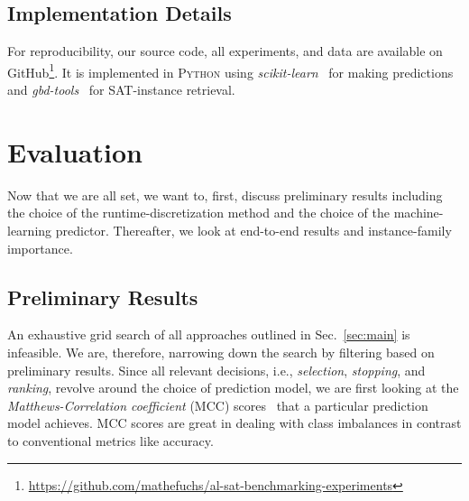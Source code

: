 \documentclass[runningheads]{llncs}
\begin{document}

\subsection{Implementation Details}
For reproducibility, our source code, all experiments, and data are available on GitHub\footnote{\url{https://github.com/mathefuchs/al-sat-benchmarking-experiments}}.
It is implemented in \textsc{Python} using \textit{scikit-learn}~\cite{scikit-learn} for making predictions and \textit{gbd-tools}~\cite{IserS18} for SAT-instance retrieval.


\section{Evaluation}
\label{sec:eval}
Now that we are all set, we want to, first, discuss preliminary results including the choice of the runtime-discretization method and the choice of the machine-learning predictor.
Thereafter, we look at end-to-end results and instance-family importance.

\subsection{Preliminary Results}
\label{sec:evalprel}
An exhaustive grid search of all approaches outlined in Sec.~\ref{sec:main} is infeasible.
We are, therefore, narrowing down the search by filtering based on preliminary results.
Since all relevant decisions, i.e., \textit{selection}, \textit{stopping}, and \textit{ranking}, revolve around the choice of prediction model, we are first looking at the \textit{Matthews-Correlation coefficient} (MCC) scores~\cite{gorodkin2004comparing,matthews1975comparison} that a particular prediction model achieves.
MCC scores are great in dealing with class imbalances in contrast to conventional metrics like accuracy.
\end{document}
